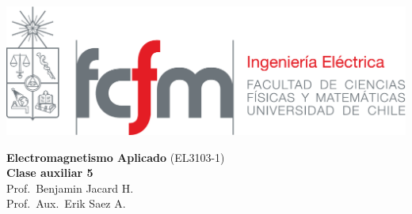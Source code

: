 \documentclass[
  11pt,
  letterpaper,
   addpoints,
   answers
  ]{exam}
\begin{document}
\noindent
\begin{minipage}{0.47\textwidth}
\includegraphics[width=\textwidth]{../fcfm_die}
\end{minipage}
\begin{minipage}{0.53\textwidth}
\begin{center} 
\large\textbf{Electromagnetismo Aplicado} (EL3103-1) \\
\large\textbf{Clase auxiliar 5} \\
\normalsize Prof.~Benjamin Jacard H.\\
\normalsize Prof.~Aux.~Erik Saez A.
\end{center}
\end{minipage}
\end{document}
